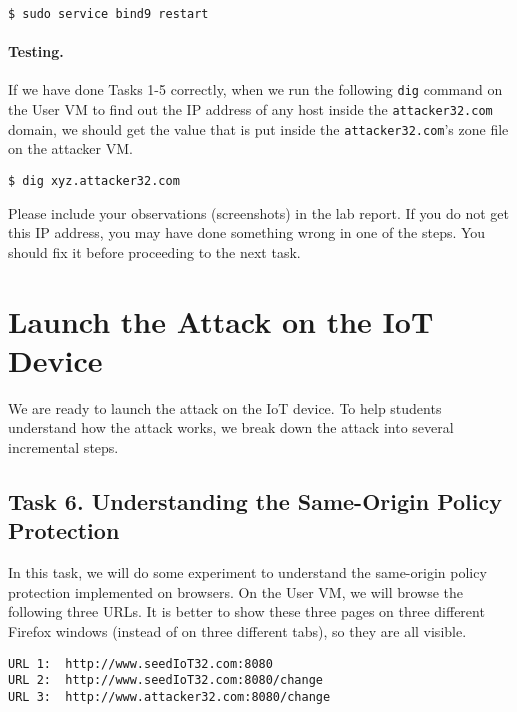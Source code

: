 \begin{lstlisting}
$ sudo service bind9 restart
\end{lstlisting}



\paragraph{Testing.}
If we have done Tasks 1-5 correctly, when we run the following 
\texttt{dig} command on the User VM to find out the IP address of 
any host inside the \texttt{attacker32.com} domain, we should  
get the value that is put inside the \texttt{attacker32.com}'s 
zone file on the attacker VM. 


\begin{lstlisting}
$ dig xyz.attacker32.com
\end{lstlisting}
 


Please include your observations (screenshots) 
in the lab report. 
If you do not get this IP address, you may have done 
something wrong in one of the steps. You should 
fix it before proceeding to the next task. 




\section{Launch the Attack on the IoT Device}

We are ready to launch the attack on the IoT device. To help students 
understand how the attack works, we break down
the attack into several incremental steps. 

\subsection{Task 6. Understanding the Same-Origin Policy Protection}

In this task, we will do some experiment to understand the 
same-origin policy protection implemented on browsers. On the User VM,
we will browse the following three URLs. It is better to show these three pages on three
different Firefox windows (instead of on three different tabs), so they are all visible. 


\begin{lstlisting}
URL 1:  http://www.seedIoT32.com:8080
URL 2:  http://www.seedIoT32.com:8080/change
URL 3:  http://www.attacker32.com:8080/change
\end{lstlisting}

